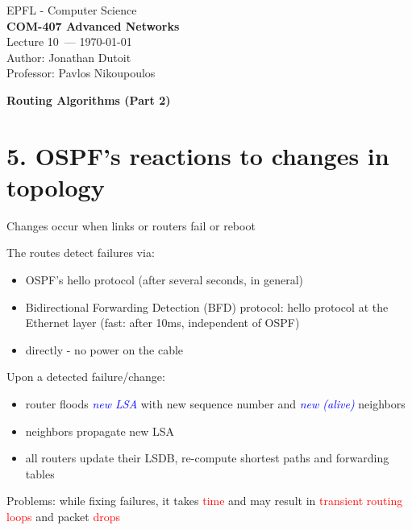 \documentclass[11pt]{article}
\newcommand{\coursename}{COM-407 Advanced Networks}
\newcommand{\lecturenum}{10}
\newcommand{\lecturedate}{\today}
\newcommand{\professor}{Pavlos Nikoupoulos}
\begin{document}
\begin{center}
  {\large EPFL - Computer Science} \\[0.5em]
  {\Large \textbf{\coursename}} \\[0.5em]
  {\large Lecture \lecturenum\ --- \lecturedate} \\[0.5em]
  {\large Author: Jonathan Dutoit} \\[0.5em]
  {\large Professor: \professor} \\[0.5em]
\end{center}

\vspace{2cm}

\begin{center}
  {\LARGE \textbf{Routing Algorithms (Part 2)}}
\end{center}

\vspace{1cm}

\section*{5. OSPF's reactions to changes in topology}

Changes occur when links or routers fail or reboot

The routes detect failures via:
\begin{itemize}
	\item OSPF's hello protocol (after several seconds, in general)
	\item Bidirectional Forwarding Detection (BFD) protocol: hello protocol at the Ethernet layer (fast: after 10ms, independent of OSPF)
	\item directly - no power on the cable
\end{itemize}

Upon a detected failure/change:
\begin{itemize}
	\item router floods \textcolor{blue}{\textit{new LSA}} with new sequence number and \textcolor{blue}{\textit{new (alive)}} neighbors
	\item neighbors propagate new LSA
	\item all routers update their LSDB, re-compute shortest paths and forwarding tables
\end{itemize}

Problems: while fixing failures, it takes \textcolor{red}{time} and may result in \textcolor{red}{transient routing loops} and packet \textcolor{red}{drops}
\end{document}
